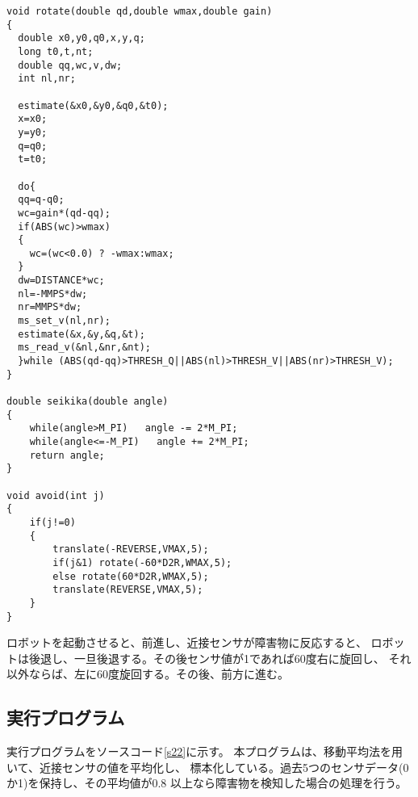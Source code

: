 \begin{lstlisting}[caption=演習21のプログラム,label=s21]
void rotate(double qd,double wmax,double gain)
{
  double x0,y0,q0,x,y,q;
  long t0,t,nt;
  double qq,wc,v,dw;
  int nl,nr;

  estimate(&x0,&y0,&q0,&t0);
  x=x0;
  y=y0;
  q=q0;
  t=t0;

  do{
  qq=q-q0;
  wc=gain*(qd-qq);
  if(ABS(wc)>wmax)
  {
    wc=(wc<0.0) ? -wmax:wmax;
  }
  dw=DISTANCE*wc;
  nl=-MMPS*dw;
  nr=MMPS*dw;
  ms_set_v(nl,nr);
  estimate(&x,&y,&q,&t);
  ms_read_v(&nl,&nr,&nt);
  }while (ABS(qd-qq)>THRESH_Q||ABS(nl)>THRESH_V||ABS(nr)>THRESH_V);
}

double seikika(double angle)
{
    while(angle>M_PI)   angle -= 2*M_PI;
    while(angle<=-M_PI)   angle += 2*M_PI;
    return angle;
}

void avoid(int j)
{
    if(j!=0)
    {
        translate(-REVERSE,VMAX,5);
        if(j&1) rotate(-60*D2R,WMAX,5);
        else rotate(60*D2R,WMAX,5);
        translate(REVERSE,VMAX,5);
    }
}
\end{lstlisting}

ロボットを起動させると、前進し、近接センサが障害物に反応すると、
ロボットは後退し、一旦後退する。その後センサ値が1であれば60度右に旋回し、
それ以外ならば、左に60度旋回する。その後、前方に進む。


\subsection{実行プログラム}
実行プログラムをソースコード\ref{s22}に示す。
本プログラムは、移動平均法を用いて、近接センサの値を平均化し、
標本化している。過去5つのセンサデータ(0か1)を保持し、その平均値が0.8
以上なら障害物を検知した場合の処理を行う。

